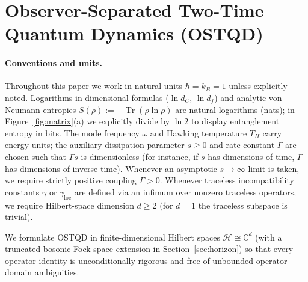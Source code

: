 \documentclass[11pt,a4paper]{article}
\theoremstyle{definition}
\theoremstyle{remark}
\newcommand{\Tr}{\operatorname{Tr}}
\newcommand{\cH}{\mathcal{H}}
\newcommand{\bbC}{\mathbb{C}}
\newcommand{\1}{\mathbf{1}}
\begin{document}
\begin{table}[!tb]
\begin{tabular}{@{}>{\raggedright\arraybackslash}p{0.19\linewidth}>{\raggedright\arraybackslash}p{0.26\linewidth}>{\raggedright\arraybackslash}p{0.29\linewidth}>{\raggedright\arraybackslash}p{0.18\linewidth}@{}}
\bottomrule
\end{tabular}
\end{table}

\section{Observer-Separated Two-Time Quantum Dynamics (OSTQD)}\label{sec:framework}

\paragraph{Conventions and units.}
Throughout this paper we work in natural units $\hbar = k_B = 1$ unless explicitly noted. Logarithms in dimensional formulas ($\ln d_C$, $\ln d_f$) and analytic von Neumann entropies $S(\rho) := -\Tr(\rho\ln\rho)$ are natural logarithms (nats); in Figure~\ref{fig:matrix}(a) we explicitly divide by $\ln 2$ to display entanglement entropy in bits. The mode frequency $\omega$ and Hawking temperature $T_H$ carry energy units; the auxiliary dissipation parameter $s \ge 0$ and rate constant $\Gamma$ are chosen such that $\Gamma s$ is dimensionless (for instance, if $s$ has dimensions of time, $\Gamma$ has dimensions of inverse time). Whenever an asymptotic $s \to \infty$ limit is taken, we require strictly positive coupling $\Gamma > 0$. Whenever traceless incompatibility constants $\gamma$ or $\gamma_{\mathrm{loc}}$ are defined via an infimum over nonzero traceless operators, we require Hilbert-space dimension $d \ge 2$ (for $d = 1$ the traceless subspace is trivial).

We formulate OSTQD in finite-dimensional Hilbert spaces $\cH \cong \bbC^d$ (with a truncated bosonic Fock-space extension in Section~\ref{sec:horizon}) so that every operator identity is unconditionally rigorous and free of unbounded-operator domain ambiguities.
\end{document}
